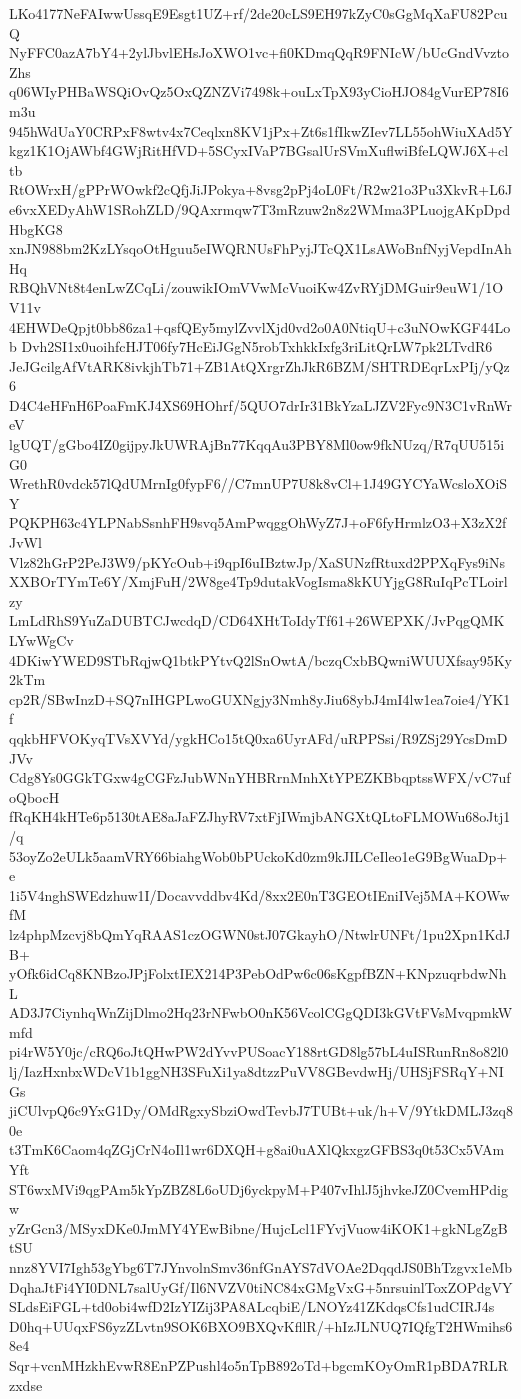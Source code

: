 LKo4177NeFAIwwUssqE9Esgt1UZ+rf/2de20cLS9EH97kZyC0sGgMqXaFU82PcuQ
NyFFC0azA7bY4+2ylJbvlEHsJoXWO1vc+fi0KDmqQqR9FNIcW/bUcGndVvztoZhs
q06WIyPHBaWSQiOvQz5OxQZNZVi7498k+ouLxTpX93yCioHJO84gVurEP78I6m3u
945hWdUaY0CRPxF8wtv4x7Ceqlxn8KV1jPx+Zt6s1fIkwZIev7LL55ohWiuXAd5Y
kgz1K1OjAWbf4GWjRitHfVD+5SCyxIVaP7BGsalUrSVmXuflwiBfeLQWJ6X+cltb
RtOWrxH/gPPrWOwkf2cQfjJiJPokya+8vsg2pPj4oL0Ft/R2w21o3Pu3XkvR+L6J
e6vxXEDyAhW1SRohZLD/9QAxrmqw7T3mRzuw2n8z2WMma3PLuojgAKpDpdHbgKG8
xnJN988bm2KzLYsqoOtHguu5eIWQRNUsFhPyjJTcQX1LsAWoBnfNyjVepdInAhHq
RBQhVNt8t4enLwZCqLi/zouwikIOmVVwMcVuoiKw4ZvRYjDMGuir9euW1/1OV11v
4EHWDeQpjt0bb86za1+qsfQEy5mylZvvlXjd0vd2o0A0NtiqU+c3uNOwKGF44Lob
Dvh2SI1x0uoihfcHJT06fy7HcEiJGgN5robTxhkkIxfg3riLitQrLW7pk2LTvdR6
JeJGcilgAfVtARK8ivkjhTb71+ZB1AtQXrgrZhJkR6BZM/SHTRDEqrLxPIj/yQz6
D4C4eHFnH6PoaFmKJ4XS69HOhrf/5QUO7drIr31BkYzaLJZV2Fyc9N3C1vRnWreV
lgUQT/gGbo4IZ0gijpyJkUWRAjBn77KqqAu3PBY8Ml0ow9fkNUzq/R7qUU515iG0
WrethR0vdck57lQdUMrnIg0fypF6//C7mnUP7U8k8vCl+1J49GYCYaWcsloXOiSY
PQKPH63c4YLPNabSsnhFH9svq5AmPwqggOhWyZ7J+oF6fyHrmlzO3+X3zX2fJvWl
Vlz82hGrP2PeJ3W9/pKYcOub+i9qpI6uIBztwJp/XaSUNzfRtuxd2PPXqFys9iNs
XXBOrTYmTe6Y/XmjFuH/2W8ge4Tp9dutakVogIsma8kKUYjgG8RuIqPcTLoirlzy
LmLdRhS9YuZaDUBTCJwcdqD/CD64XHtToIdyTf61+26WEPXK/JvPqgQMKLYwWgCv
4DKiwYWED9STbRqjwQ1btkPYtvQ2lSnOwtA/bczqCxbBQwniWUUXfsay95Ky2kTm
cp2R/SBwInzD+SQ7nIHGPLwoGUXNgjy3Nmh8yJiu68ybJ4mI4lw1ea7oie4/YK1f
qqkbHFVOKyqTVsXVYd/ygkHCo15tQ0xa6UyrAFd/uRPPSsi/R9ZSj29YcsDmDJVv
Cdg8Ys0GGkTGxw4gCGFzJubWNnYHBRrnMnhXtYPEZKBbqptssWFX/vC7ufoQbocH
fRqKH4kHTe6p5130tAE8aJaFZJhyRV7xtFjIWmjbANGXtQLtoFLMOWu68oJtj1/q
53oyZo2eULk5aamVRY66biahgWob0bPUckoKd0zm9kJILCeIleo1eG9BgWuaDp+e
1i5V4nghSWEdzhuw1I/Docavvddbv4Kd/8xx2E0nT3GEOtIEniIVej5MA+KOWwfM
lz4phpMzcvj8bQmYqRAAS1czOGWN0stJ07GkayhO/NtwlrUNFt/1pu2Xpn1KdJB+
yOfk6idCq8KNBzoJPjFolxtIEX214P3PebOdPw6c06sKgpfBZN+KNpzuqrbdwNhL
AD3J7CiynhqWnZijDlmo2Hq23rNFwbO0nK56VcolCGgQDI3kGVtFVsMvqpmkWmfd
pi4rW5Y0jc/cRQ6oJtQHwPW2dYvvPUSoacY188rtGD8lg57bL4uISRunRn8o82l0
lj/IazHxnbxWDcV1b1ggNH3SFuXi1ya8dtzzPuVV8GBevdwHj/UHSjFSRqY+NIGs
jiCUlvpQ6c9YxG1Dy/OMdRgxySbziOwdTevbJ7TUBt+uk/h+V/9YtkDMLJ3zq80e
t3TmK6Caom4qZGjCrN4oIl1wr6DXQH+g8ai0uAXlQkxgzGFBS3q0t53Cx5VAmYft
ST6wxMVi9qgPAm5kYpZBZ8L6oUDj6yckpyM+P407vIhlJ5jhvkeJZ0CvemHPdigw
yZrGcn3/MSyxDKe0JmMY4YEwBibne/HujcLcl1FYvjVuow4iKOK1+gkNLgZgBtSU
nnz8YVI7Igh53gYbg6T7JYnvolnSmv36nfGnAYS7dVOAe2DqqdJS0BhTzgvx1eMb
DqhaJtFi4YI0DNL7salUyGf/Il6NVZV0tiNC84xGMgVxG+5nrsuinlToxZOPdgVY
SLdsEiFGL+td0obi4wfD2IzYIZij3PA8ALcqbiE/LNOYz41ZKdqsCfs1udCIRJ4s
D0hq+UUqxFS6yzZLvtn9SOK6BXO9BXQvKfllR/+hIzJLNUQ7IQfgT2HWmihs68e4
Sqr+vcnMHzkhEvwR8EnPZPushl4o5nTpB892oTd+bgcmKOyOmR1pBDA7RLRzxdse
